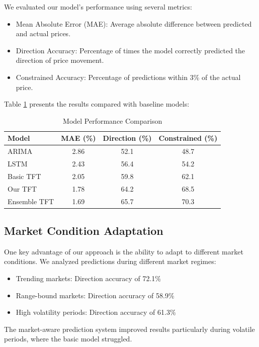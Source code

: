 \documentclass[conference]{IEEEtran}
\begin{document}
We evaluated our model's performance using several metrics:

\begin{itemize}
\item Mean Absolute Error (MAE): Average absolute difference between predicted and actual prices.
\item Direction Accuracy: Percentage of times the model correctly predicted the direction of price movement.
\item Constrained Accuracy: Percentage of predictions within 3\% of the actual price.
\end{itemize}

Table \ref{tab:performance} presents the results compared with baseline models:

\begin{table}[h]
\caption{Model Performance Comparison}
\centering
\begin{tabular}{lccc}
\toprule
\textbf{Model} & \textbf{MAE (\%)} & \textbf{Direction (\%)} & \textbf{Constrained (\%)} \\
\midrule
ARIMA & 2.86 & 52.1 & 48.7 \\
LSTM & 2.43 & 56.4 & 54.2 \\
Basic TFT & 2.05 & 59.8 & 62.1 \\
Our TFT & 1.78 & 64.2 & 68.5 \\
Ensemble TFT & 1.69 & 65.7 & 70.3 \\
\bottomrule
\end{tabular}
\label{tab:performance}
\end{table}

\subsection{Market Condition Adaptation}
One key advantage of our approach is the ability to adapt to different market conditions. We analyzed predictions during different market regimes:

\begin{itemize}
\item Trending markets: Direction accuracy of 72.1\%
\item Range-bound markets: Direction accuracy of 58.9\%
\item High volatility periods: Direction accuracy of 61.3\%
\end{itemize}

The market-aware prediction system improved results particularly during volatile periods, where the basic model struggled.
\end{document}
